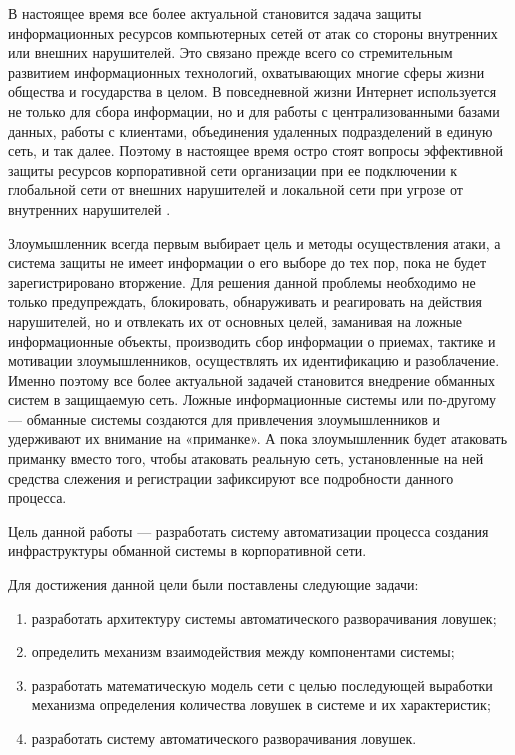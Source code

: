 
В настоящее время все более актуальной становится задача защиты информационных ресурсов компьютерных сетей от атак со стороны внутренних или внешних нарушителей. Это связано прежде всего со стремительным развитием информационных технологий, охватывающих многие сферы жизни общества и государства в целом. В повседневной жизни Интернет используется не только для сбора информации, но и для работы с централизованными базами данных, работы с клиентами, объединения удаленных подразделений в единую сеть, и так далее. Поэтому в настоящее время остро стоят вопросы  эффективной защиты ресурсов корпоративной сети организации при ее подключении к глобальной сети от внешних нарушителей и локальной сети при угрозе от внутренних нарушителей \citep{emelyanova_fralenko}.

Злоумышленник всегда первым выбирает цель и методы осуществления атаки, а система защиты не имеет информации о его выборе до тех пор, пока не будет зарегистрировано вторжение. Для решения данной проблемы необходимо не только предупреждать, блокировать, обнаруживать и реагировать на действия нарушителей, но и отвлекать их от основных целей, заманивая на ложные информационные объекты, производить сбор информации о приемах, тактике и мотивации злоумышленников, осуществлять их идентификацию и разоблачение. Именно поэтому все более актуальной задачей становится внедрение обманных систем в защищаемую сеть. Ложные информационные системы или по-другому — обманные системы создаются для привлечения злоумышленников и удерживают их внимание на «приманке». А пока злоумышленник будет атаковать приманку вместо того, чтобы атаковать реальную сеть, установленные на ней средства слежения и регистрации зафиксируют все подробности данного процесса.

Цель данной работы — разработать систему автоматизации процесса создания инфраструктуры обманной системы в корпоративной сети.

Для достижения данной цели были поставлены следующие задачи: 

\begin{enumerate}
	\item разработать архитектуру системы автоматического разворачивания ловушек;
	\item определить механизм взаимодействия между компонентами системы;
	\item разработать математическую модель сети с целью последующей выработки механизма определения количества ловушек в системе и их характеристик;
	\item разработать систему автоматического разворачивания ловушек.
\end{enumerate}